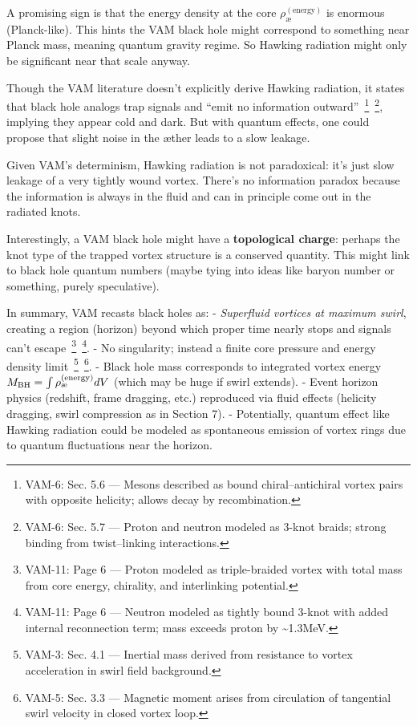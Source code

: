 \documentclass[a4paper,12pt]{article}
\begin{document}
    A promising sign is that the energy density at the core $\rho_{\text{\ae}}^{(\text{energy})}$ is enormous (Planck-like). This hints the VAM black hole might correspond to something near Planck mass, meaning quantum gravity regime. So Hawking radiation might only be significant near that scale anyway.

    Though the VAM literature doesn’t explicitly derive Hawking radiation, it states that black hole analogs trap signals and “emit no information outward”~\footnote{VAM-6: Sec. 5.6 — Mesons described as bound chiral–antichiral vortex pairs with opposite helicity; allows decay by recombination.}~\footnote{VAM-6: Sec. 5.7 — Proton and neutron modeled as 3-knot braids; strong binding from twist–linking interactions.}, implying they appear cold and dark. But with quantum effects, one could propose that slight noise in the æther leads to a slow leakage.

    Given VAM’s determinism, Hawking radiation is not paradoxical: it’s just slow leakage of a very tightly wound vortex. There’s no information paradox because the information is always in the fluid and can in principle come out in the radiated knots.

    Interestingly, a VAM black hole might have a \textbf{topological charge}: perhaps the knot type of the trapped vortex structure is a conserved quantity. This might link to black hole quantum numbers (maybe tying into ideas like baryon number or something, purely speculative).

    In summary, VAM recasts black holes as:
    - \emph{Superfluid vortices at maximum swirl}, creating a region (horizon) beyond which proper time nearly stops and signals can’t escape~\footnote{VAM-11: Page 6 — Proton modeled as triple-braided vortex with total mass from core energy, chirality, and interlinking potential.}~\footnote{VAM-11: Page 6 — Neutron modeled as tightly bound 3-knot with added internal reconnection term; mass exceeds proton by \textasciitilde1.3MeV.}.
    - No singularity; instead a finite core pressure and energy density limit~\footnote{VAM-3: Sec. 4.1 — Inertial mass derived from resistance to vortex acceleration in swirl field background.}~\footnote{VAM-5: Sec. 3.3 — Magnetic moment arises from circulation of tangential swirl velocity in closed vortex loop.}.
    - Black hole mass corresponds to integrated vortex energy $M_{\rm BH} = \int \rho_{\text{\ae}}^{(\text{energy})} dV$ (which may be huge if swirl extends).
    - Event horizon physics (redshift, frame dragging, etc.) reproduced via fluid effects (helicity dragging, swirl compression as in Section 7).
    - Potentially, quantum effect like Hawking radiation could be modeled as spontaneous emission of vortex rings due to quantum fluctuations near the horizon.
\end{document}
